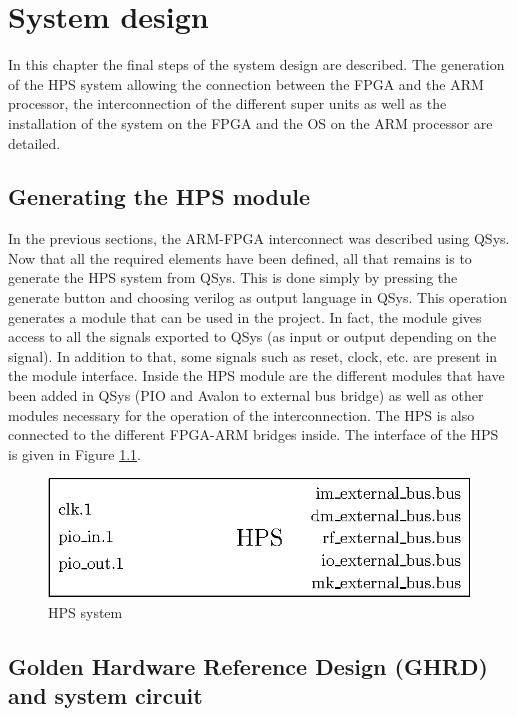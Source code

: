 \chapter{System design}

In this chapter the final steps of the system design are described. The generation of the HPS 
system allowing the connection between the FPGA and the ARM processor, the interconnection of the 
different super units as well as the installation of the system on the FPGA and the OS on the 
ARM processor are detailed.

\section{Generating the HPS module}

In the previous sections, the ARM-FPGA interconnect was described using QSys. Now that all the 
required elements have been defined, all that remains is to generate the HPS system from QSys. 
This is done simply by pressing the generate button and choosing verilog as output language in QSys.
This operation generates a module that can be used in the project. In fact, the module gives access 
to all the signals exported to QSys (as input or output depending on the signal). In addition to 
that, some signals such as reset, clock, etc. are present in the module interface. Inside the HPS 
module are the different modules that have been added in QSys (PIO and Avalon to external bus bridge) 
as well as other modules necessary for the operation of the interconnection. The HPS is also 
connected to the different FPGA-ARM bridges inside. The interface of the HPS is given in 
Figure \ref{fig:system/hps}.

\begin{figure}[H]
    \centering
    \includegraphics[scale=0.8]{Chapter6-System/res/hps.eps}
    \caption{HPS system}
    \label{fig:system/hps}
\end{figure}

\section{Golden Hardware Reference Design (GHRD) and system circuit}

